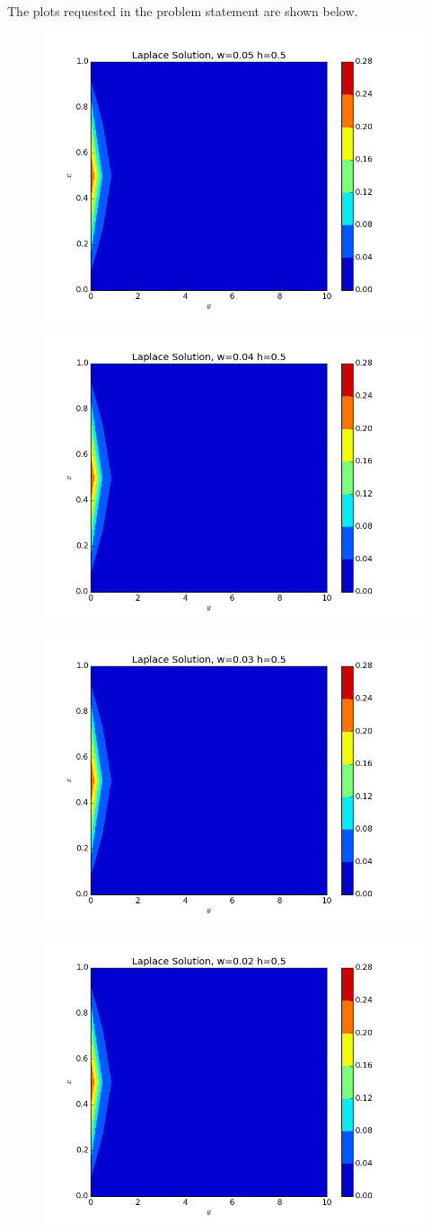 \documentclass[10pt,letter]{article}
\begin{document}
The plots requested in the problem statement are shown below.

\begin{figure}[H]
  \centering
    \includegraphics[width=.6\textwidth]{homework7_problem1_plot1}
\end{figure}
\begin{figure}[H]
  \centering
    \includegraphics[width=.6\textwidth]{homework7_problem1_plot2}
\end{figure}
\begin{figure}[H]
  \centering
    \includegraphics[width=.6\textwidth]{homework7_problem1_plot3}
\end{figure}
\begin{figure}[H]
  \centering
    \includegraphics[width=.6\textwidth]{homework7_problem1_plot4}
\end{figure}
\end{document}
